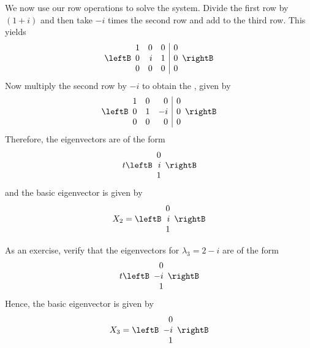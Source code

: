 \begin{solution}
We now use our row operations to solve the system.
Divide the first row by $\left( 1+i\right) $ and then take 
$-i$ times the second row and add to the third row. This yields
\begin{equation*}
\leftB
\begin{array}{rrr|r}
1 & 0 & 0 & 0 \\
0 & i & 1 & 0 \\
0 & 0 & 0 & 0
\end{array}
\rightB
\end{equation*}
Now multiply the second row by $-i$ to obtain the {\rref}, given by 
\begin{equation*}
\leftB
\begin{array}{rrr|r}
1 & 0 &  0 & 0 \\
0 & 1 & -i & 0 \\
0 & 0 &  0 & 0
\end{array}
\rightB
\end{equation*}
Therefore, the eigenvectors are of the form
\begin{equation*}
t\leftB
\begin{array}{r}
0 \\
i \\
1
\end{array}
\rightB 
\end{equation*}
and the basic eigenvector is given by
\begin{equation*}
X_2 =
\leftB
\begin{array}{r}
0 \\
i \\
1
\end{array}
\rightB
\end{equation*}

As an exercise, verify that the eigenvectors for $\lambda_3 =2-i$ are of the form 
\begin{equation*}
t\leftB
\begin{array}{r}
 0 \\
-i \\
 1
\end{array}
\rightB 
\end{equation*}
Hence, the basic eigenvector is given by 
\begin{equation*}
X_3 = \leftB
\begin{array}{r}
 0 \\
-i \\
 1
\end{array}
\rightB 
\end{equation*}


\end{solution}
